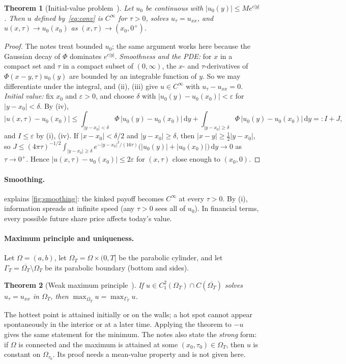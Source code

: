 \documentclass[11pt,a4paper]{article}
\newtheorem{theorem}{Theorem}
\theoremstyle{definition}
\theoremstyle{remark}
\newcommand{\dd}{\,\mathrm{d}}
\begin{document}
\begin{theorem}[Initial-value problem~\cite{classnotes,evans}]\label{thm:kernel}
Let $u_0$ be continuous with $|u_0(y)|\le Me^{c|y|}$. Then $u$ defined by~\eqref{eq:conv} is $C^\infty$ for $\tau>0$,
solves $u_\tau=u_{xx}$, and $u(x,\tau)\to u_0(x_0)$ as $(x,\tau)\to(x_0,0^+)$.
\end{theorem}

\begin{proof}
The notes treat bounded $u_0$; the same argument works here because the Gaussian decay of $\Phi$ dominates
$e^{c|y|}$. \emph{Smoothness and the PDE:} for $x$ in a compact set and $\tau$ in a compact subset of $(0,\infty)$,
the $x$- and $\tau$-derivatives of $\Phi(x-y,\tau)u_0(y)$ are bounded by an integrable function of $y$. So we may
differentiate under the integral, and (ii), (iii) give $u\in C^\infty$ with $u_\tau-u_{xx}=0$.
\emph{Initial value:} fix $x_0$ and $\varepsilon>0$, and choose $\delta$ with $|u_0(y)-u_0(x_0)|<\varepsilon$ for
$|y-x_0|<\delta$. By (iv),
\[
  |u(x,\tau)-u_0(x_0)|\le\int_{|y-x_0|<\delta}\Phi\,|u_0(y)-u_0(x_0)|\dd y
  +\int_{|y-x_0|\ge\delta}\Phi\,|u_0(y)-u_0(x_0)|\dd y=:I+J,
\]
and $I\le\varepsilon$ by (i), (iv). If $|x-x_0|<\delta/2$ and $|y-x_0|\ge\delta$, then $|x-y|\ge\frac12|y-x_0|$, so
$J\le(4\pi\tau)^{-1/2}\int_{|y-x_0|\ge\delta}e^{-|y-x_0|^2/(16\tau)}\big(|u_0(y)|+|u_0(x_0)|\big)\dd y\to0$ as $\tau\to0^+$.
Hence $|u(x,\tau)-u_0(x_0)|\le2\varepsilon$ for $(x,\tau)$ close enough to $(x_0,0)$.
\end{proof}

\paragraph{Smoothing.}  explains \cref{fig:smoothing}: the kinked payoff becomes
$C^\infty$ at every $\tau>0$. By (i), information spreads at infinite speed (any $\tau>0$ sees all of $u_0$). In
financial terms, every possible future share price affects today's value.

\paragraph{Maximum principle and uniqueness.} Let $\Omega=(a,b)$, let $\Omega_T=\Omega\times(0,T]$ be the parabolic
cylinder, and let $\Gamma_T=\overline{\Omega_T}\setminus\Omega_T$ be its parabolic boundary (bottom and sides).

\begin{theorem}[Weak maximum principle~\cite{classnotes,evans,nandakumaran}]\label{thm:maxprinciple}
If $u\in C^2_1(\Omega_T)\cap C(\overline{\Omega_T})$ solves $u_\tau=u_{xx}$ in $\Omega_T$, then
$\max_{\overline{\Omega_T}}u=\max_{\Gamma_T}u$.
\end{theorem}
The hottest point is attained initially or on the walls; a hot spot cannot appear spontaneously in the interior
or at a later time. Applying the theorem to $-u$ gives the same statement for the minimum. The notes also state
the \emph{strong} form: if $\Omega$ is connected and the maximum is attained at some $(x_0,\tau_0)\in\Omega_T$, then
$u$ is constant on $\Omega_{\tau_0}$. Its proof needs a mean-value property and is not given here.
\end{document}
